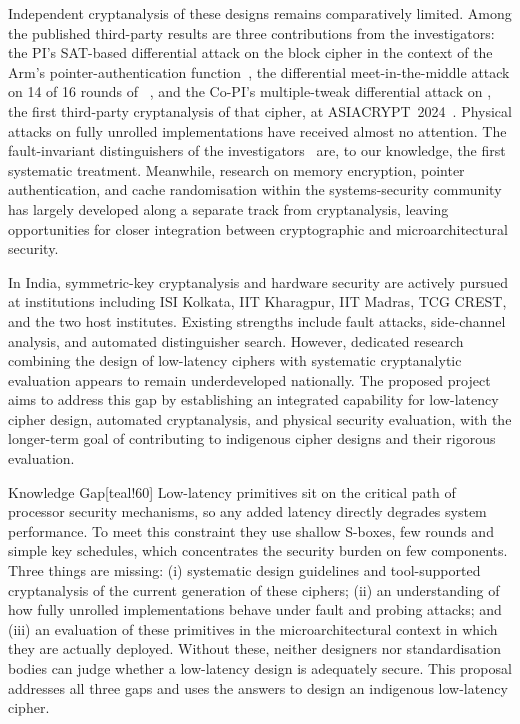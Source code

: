 Independent cryptanalysis of these designs remains comparatively limited. Among the published third-party results are three contributions from the investigators: the PI's SAT-based differential attack on the  block cipher in the context of the Arm's pointer-authentication function~, the differential meet-in-the-middle attack on 14 of 16 rounds of ~, and the Co-PI's multiple-tweak differential attack on , the first third-party cryptanalysis of that cipher, at ASIACRYPT~2024~.
Physical attacks on fully unrolled implementations have received almost no attention. The fault-invariant distinguishers of the investigators~ are, to our knowledge, the first systematic treatment.
Meanwhile, research on memory encryption, pointer authentication, and cache randomisation within the systems-security community has largely developed along a separate track from cryptanalysis, leaving opportunities for closer integration between cryptographic and microarchitectural security.

In India, symmetric-key cryptanalysis and hardware security are actively pursued at institutions including ISI Kolkata, IIT Kharagpur, IIT Madras, TCG CREST, and the two host institutes.
Existing strengths include fault attacks, side-channel analysis, and automated distinguisher search.
However, dedicated research combining the design of low-latency ciphers with systematic cryptanalytic evaluation appears to remain underdeveloped nationally.
The proposed project aims to address this gap by establishing an integrated capability for low-latency cipher design, automated cryptanalysis, and physical security evaluation, with the longer-term goal of contributing to indigenous cipher designs and their rigorous evaluation.

\begin{genericbox}{Knowledge Gap}[teal!60]
Low-latency primitives sit on the critical path of processor security mechanisms, so any added latency directly degrades system performance.
To meet this constraint they use shallow S-boxes, few rounds and simple key schedules, which concentrates the security burden on few components.
Three things are missing:
(i) systematic design guidelines and tool-supported cryptanalysis of the current generation of these ciphers;
(ii) an understanding of how fully unrolled implementations behave under fault and probing attacks; and
(iii) an evaluation of these primitives in the microarchitectural context in which they are actually deployed.
Without these, neither designers nor standardisation bodies can judge whether a low-latency design is adequately secure.
This proposal addresses all three gaps and uses the answers to design an indigenous low-latency cipher.
\end{genericbox}

